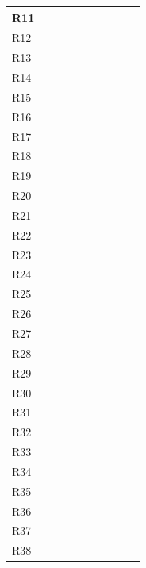 \documentclass{article}
\begin{document}
\begin{longtable}[c]{|m{0.15cm}|m{0.15cm}|m{0.15cm}|m{0.15cm}|m{0.15cm}|m{0.15cm}|m{0.15cm}|m{0.15cm}|m{0.15cm}|m{0.15cm}|}
 \hline
 R11 &   &  &  &   &   &   &   &   &      \\
 \hline
 R12 &    &   &  &   &   &   &   &   &   \\
 \hline
 R13 &    &   &  &   &   &   &   &   &   \\
 \hline
 R14 &    &   &  &   &   &   &   &   &   \\
 \hline
 R15 &   &  &   &   &   &   &   &   &      \\
 \hline
 R16 &   &  &   &   &   &   &   &   &      \\
 \hline
 R17 &   &   &  &   &  &   &   &   &      \\
 \hline
 R18 &   &   &  &   &   &   &   &   &      \\
 \hline
 R19 &   &   &   &  &   &   &   &   &      \\
 \hline
 R20 &   &   &   &  &  &   &   &   &     \\
 \hline
 R21 &   &   &   &  &   &   &   &   &     \\
 \hline
 R22 &   &   &   &   &   &   &  &   &     \\
 \hline
 R23 &   &   &   &   &   &   &   &   &     \\
 \hline
 R24 &   &   &   &   &   &   &   &   &     \\
 \hline
 R25 &   &   &   &   &   &   &   &   &     \\
 \hline
 R26 &   &   &   &   &  &   &   &   &      \\
 \hline
 R27 &   &   &   &   &  &   &   &   &      \\
 \hline
 R28 &   &   &   &   &   &  &   &   &      \\
 \hline
 R29 &   &   &   &   &   &  &   &   &  \\
 \hline
 R30 &   &   &   &   &   &  &   &   &      \\
 \hline
 R31 &   &   &   &   &   &  &   &   &      \\
 \hline
 R32 &   &   &   &   &   &  &   &   &      \\
 \hline
 R33 &   &   &   &   &   &  &   &   &      \\
 \hline
 R34 &   &   &   &   &   &   &   &  &      \\
 \hline
 R35 &   &   &   &   &   &   &   &  &      \\
 \hline
 R36 &   &   &   &   &   &   &   &  &      \\
 \hline
 R37 &   &   &   &   &   &   &   &  &      \\
 \hline
 R38 &   &   &   &   &   &   &  &   &     \\

\end{longtable}
\end{document}
